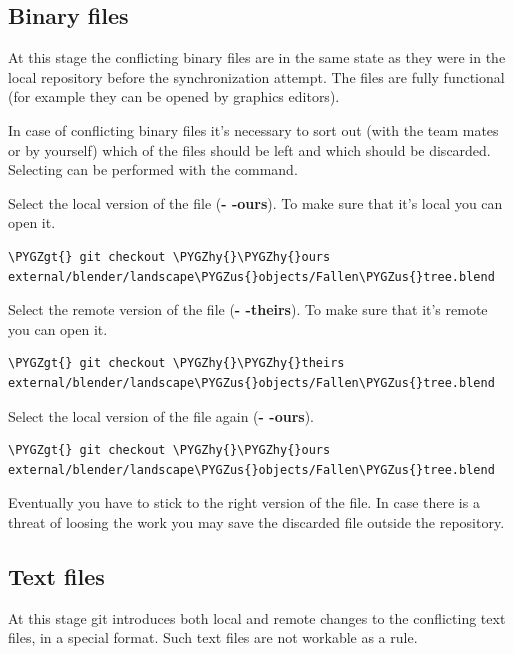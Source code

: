 \documentclass[a4paper,12pt,oneside]{sphinxmanual}
\def\PYGZus{\char`\_}
\def\PYGZgt{\char`\>}
\def\PYGZhy{\char`\-}
\begin{document}
\subsection{Binary files}
\label{git_short_manual:id19}
At this stage the conflicting binary files are in the same state as they were in the local repository before the synchronization attempt. The files are fully functional (for example they can be opened by graphics editors).

In case of conflicting binary files it's necessary to sort out (with the team mates or by yourself) which of the files should be left and which should be discarded. Selecting can be performed with the  command.

Select the local version of the file (\textbf{- -ours}). To make sure that it's local you can open it.

\begin{Verbatim}[commandchars=\\\{\}]
\PYGZgt{} git checkout \PYGZhy{}\PYGZhy{}ours external/blender/landscape\PYGZus{}objects/Fallen\PYGZus{}tree.blend
\end{Verbatim}

Select the remote version of the file (\textbf{- -theirs}). To make sure that it's remote you can open it.

\begin{Verbatim}[commandchars=\\\{\}]
\PYGZgt{} git checkout \PYGZhy{}\PYGZhy{}theirs external/blender/landscape\PYGZus{}objects/Fallen\PYGZus{}tree.blend
\end{Verbatim}

Select the local version of the file again (\textbf{- -ours}).

\begin{Verbatim}[commandchars=\\\{\}]
\PYGZgt{} git checkout \PYGZhy{}\PYGZhy{}ours external/blender/landscape\PYGZus{}objects/Fallen\PYGZus{}tree.blend
\end{Verbatim}

Eventually you have to stick to the right version of the file. In case there is a threat of loosing the work you may save the discarded file outside the repository.


\subsection{Text files}
\label{git_short_manual:id20}
At this stage git introduces both local and remote changes to the conflicting text files, in a special format. Such text files are not workable as a rule.
\end{document}
